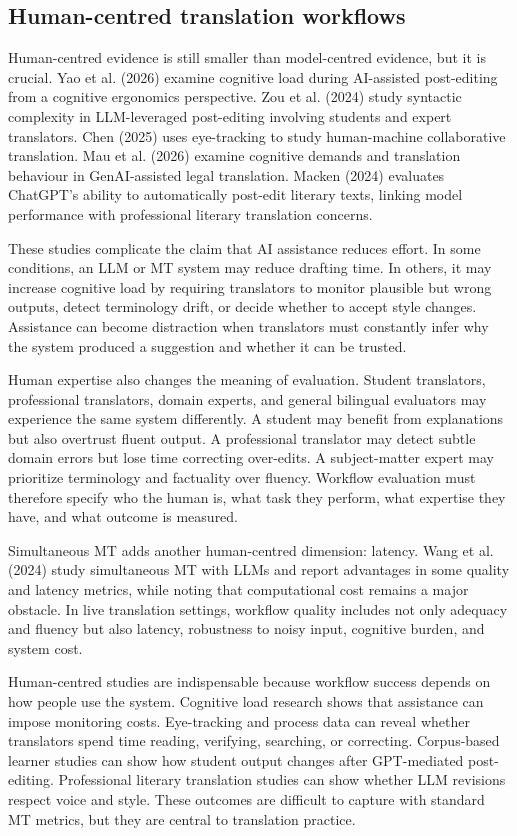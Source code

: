 \documentclass[11pt]{article}
\begin{document}
\subsection{Human-centred translation workflows}
Human-centred evidence is still smaller than model-centred evidence, but it is crucial. Yao et al. (2026) examine cognitive load during AI-assisted post-editing from a cognitive ergonomics perspective. Zou et al. (2024) study syntactic complexity in LLM-leveraged post-editing involving students and expert translators. Chen (2025) uses eye-tracking to study human-machine collaborative translation. Mau et al. (2026) examine cognitive demands and translation behaviour in GenAI-assisted legal translation. Macken (2024) evaluates ChatGPT's ability to automatically post-edit literary texts, linking model performance with professional literary translation concerns.

These studies complicate the claim that AI assistance reduces effort. In some conditions, an LLM or MT system may reduce drafting time. In others, it may increase cognitive load by requiring translators to monitor plausible but wrong outputs, detect terminology drift, or decide whether to accept style changes. Assistance can become distraction when translators must constantly infer why the system produced a suggestion and whether it can be trusted.

Human expertise also changes the meaning of evaluation. Student translators, professional translators, domain experts, and general bilingual evaluators may experience the same system differently. A student may benefit from explanations but also overtrust fluent output. A professional translator may detect subtle domain errors but lose time correcting over-edits. A subject-matter expert may prioritize terminology and factuality over fluency. Workflow evaluation must therefore specify who the human is, what task they perform, what expertise they have, and what outcome is measured.

Simultaneous MT adds another human-centred dimension: latency. Wang et al. (2024) study simultaneous MT with LLMs and report advantages in some quality and latency metrics, while noting that computational cost remains a major obstacle. In live translation settings, workflow quality includes not only adequacy and fluency but also latency, robustness to noisy input, cognitive burden, and system cost.


Human-centred studies are indispensable because workflow success depends on how people use the system. Cognitive load research shows that assistance can impose monitoring costs. Eye-tracking and process data can reveal whether translators spend time reading, verifying, searching, or correcting. Corpus-based learner studies can show how student output changes after GPT-mediated post-editing. Professional literary translation studies can show whether LLM revisions respect voice and style. These outcomes are difficult to capture with standard MT metrics, but they are central to translation practice.
\end{document}
